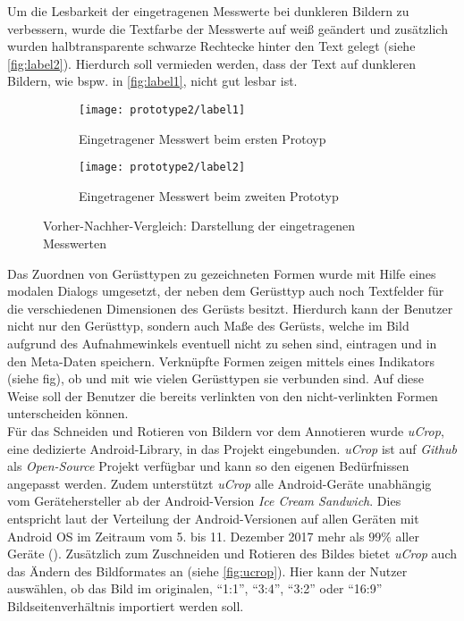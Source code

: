 Um die Lesbarkeit der eingetragenen Messwerte bei dunkleren Bildern zu verbessern, wurde die Textfarbe der Messwerte auf weiß geändert und zusätzlich wurden halbtransparente schwarze Rechtecke hinter den Text gelegt (siehe \autoref{fig:label2}).
Hierdurch soll vermieden werden, dass der Text auf dunkleren Bildern, wie bspw. in \autoref{fig:label1}, nicht gut lesbar ist.
\begin{figure}[h]
  \centering
  \begin{subfigure}[t]{0.4\textwidth}
    \texttt{[image: prototype2/label1]}
    \caption{Eingetragener Messwert beim ersten Protoyp}
    \label{fig:label1}
  \end{subfigure}
  \begin{subfigure}[t]{0.4\textwidth}
    \texttt{[image: prototype2/label2]}
    \caption{Eingetragener Messwert beim zweiten Prototyp}
    \label{fig:label2}
  \end{subfigure}
  \caption{Vorher-Nachher-Vergleich: Darstellung der eingetragenen Messwerten}
  \label{fig:labels}
\end{figure}

Das Zuordnen von Gerüsttypen zu gezeichneten Formen wurde mit Hilfe eines modalen Dialogs umgesetzt, der neben dem Gerüsttyp auch noch Textfelder für die verschiedenen Dimensionen des Gerüsts besitzt.
Hierdurch kann der Benutzer nicht nur den Gerüsttyp, sondern auch Maße des Gerüsts, welche im Bild aufgrund des Aufnahmewinkels eventuell nicht zu sehen sind, eintragen und in den Meta-Daten speichern.
Verknüpfte Formen zeigen mittels eines Indikators (siehe fig), ob und mit wie vielen Gerüsttypen sie verbunden sind.
Auf diese Weise soll der Benutzer die bereits verlinkten von den nicht-verlinkten Formen unterscheiden können. \\

Für das Schneiden und Rotieren von Bildern vor dem Annotieren wurde \emph{uCrop}, eine dedizierte Android-Library, in das Projekt eingebunden.
\emph{uCrop} ist auf \emph{Github} als \emph{Open-Source} Projekt verfügbar und kann so den eigenen Bedürfnissen angepasst werden. 
Zudem unterstützt \emph{uCrop} alle Android-Geräte unabhängig vom Gerätehersteller ab der Android-Version \emph{Ice Cream Sandwich}. 
Dies entspricht laut der Verteilung der Android-Versionen auf allen Geräten mit Android OS im Zeitraum vom 5. bis 11. Dezember 2017 mehr als $99\%$ aller Geräte ().
Zusätzlich zum Zuschneiden und Rotieren des Bildes bietet \emph{uCrop} auch das Ändern des Bildformates an (siehe \autoref{fig:ucrop}).
Hier kann der Nutzer auswählen, ob das Bild im originalen, ``1:1'', ``3:4'', ``3:2'' oder ``16:9'' Bildseitenverhältnis importiert werden soll.


